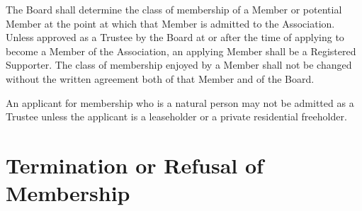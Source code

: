 \documentclass[10pt]{mk-articles-of-association}
\newcommand{\EC}[0]{Board}
\newcommand{\Exec}[0]{\EC{} }
\begin{document}
\begin{constenum}
  \item The \Exec shall determine the class of membership of a Member
    or potential Member at the point at which that Member is admitted
    to the Association. Unless approved as a Trustee by the
    \Exec at or after the time of applying to become a Member of the
    Association, an applying Member shall be a Registered Supporter.
    The class of membership enjoyed by a Member
    shall not be changed without the written agreement both of that
    Member and of the \EC{}.

  \item An applicant for membership who is a natural person may not be
    admitted as a Trustee unless the applicant is a leaseholder or
    a private residential freeholder.

\end{constenum}



\section{Termination or Refusal of Membership}
\end{document}
